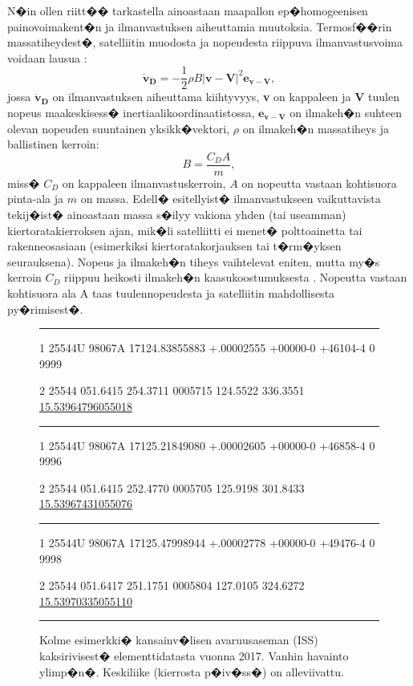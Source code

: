 \documentclass[12pt,a4paper,finnish,margin=2in]{article}
\begin{document}
N�in ollen riitt�� tarkastella ainoastaan maapallon ep�homogeenisen painovoimakent�n ja ilmanvastuksen aiheuttamia muutoksia. Termosf��rin massatiheydest�, satelliitin muodosta ja nopeudesta riippuva ilmanvastusvoima voidaan lausua \citep[esim.][luku 8.6.2]{vallado_2001}:
\begin{equation} \label{airdrag_eq}
\mathbf{\dot{v}_D} = - \frac{1}{2} \rho B \left | \mathbf{v} - \mathbf{V} \right |^2 \mathbf{e_{v-V}},
\end{equation}
jossa $\mathbf{\dot{v}_D}$ on ilmanvastuksen aiheuttama kiihtyvyys, \textbf{v} on kappaleen ja \textbf{V} tuulen nopeus maakeskisess� inertiaalikoordinaatistossa, $\mathbf{e_{v-V}}$ on ilmakeh�n suhteen olevan nopeuden suuntainen yksikk�vektori, $\rho$ on ilmakeh�n massatiheys ja ballistinen kerroin:
\begin{equation} \label{ballistic_eq}
B = \frac{C_D A}{m},
\end{equation}
miss� $C_D$ on kappaleen ilmanvastuskerroin, $A$ on nopeutta vastaan kohtisuora pinta-ala ja $m$ on massa. Edell� esitellyist� ilmanvastukseen vaikuttavista tekij�ist� ainoastaan massa s�ilyy vakiona yhden (tai useamman) kiertoratakierroksen ajan, mik�li satelliitti ei menet� polttoainetta tai rakenneosasiaan (esimerkiksi kiertoratakorjauksen tai t�rm�yksen seurauksena). Nopeus ja ilmakeh�n tiheys vaihtelevat eniten, mutta my�s kerroin $C_D$ riippuu heikosti ilmakeh�n kaasukoostumuksesta \citep{moe_2006}. Nopeutta vastaan kohtisuora ala A taas tuulennopeudesta ja satelliitin mahdollisesta py�rimisest�. 

\begin{figure}[t]
\ttfamily
\scriptsize
\noindent\rule[0.5ex]{\linewidth}{1pt}
1 25544U 98067A   17124.83855883 +.00002555 +00000-0 +46104-4 0  9999

2 25544 051.6415 254.3711 0005715 124.5522 336.3551 \underline{15.53964796055018}
\noindent\rule[0.5ex]{\linewidth}{1pt}
1 25544U 98067A   17125.21849080 +.00002605 +00000-0 +46858-4 0  9996

2 25544 051.6415 252.4770 0005705 125.9198 301.8433 \underline{15.53967431055076}
\noindent\rule[0.5ex]{\linewidth}{1pt}

1 25544U 98067A   17125.47998944 +.00002778 +00000-0 +49476-4 0  9998

2 25544 051.6417 251.1751 0005804 127.0105 324.6272 \underline{15.53970335055110}
\noindent\rule[0.5ex]{\linewidth}{1pt}
\rmfamily
\caption{Kolme esimerkki� kansainv�lisen avaruusaseman (ISS) kaksirivisest� elementtidatasta vuonna  2017. Vanhin havainto ylimp�n�. Keskiliike (kierrosta p�iv�ss�) on alleviivattu.}
\label{fig:tle}
\end{figure}
\end{document}

